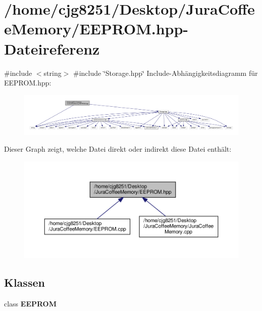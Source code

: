 \section{/home/cjg8251/\+Desktop/\+Jura\+Coffee\+Memory/\+E\+E\+P\+R\+OM.hpp-\/\+Dateireferenz}
\label{_e_e_p_r_o_m_8hpp}
{\ttfamily \#include $<$string$>$}\newline
{\ttfamily \#include \char`\"{}Storage.\+hpp\char`\"{}}\newline
Include-\/\+Abhängigkeitsdiagramm für E\+E\+P\+R\+O\+M.\+hpp\+:
\nopagebreak
\begin{figure}[H]
\begin{center}
\leavevmode
\includegraphics[width=350pt]{_e_e_p_r_o_m_8hpp__incl}
\end{center}
\end{figure}
Dieser Graph zeigt, welche Datei direkt oder indirekt diese Datei enthält\+:
\nopagebreak
\begin{figure}[H]
\begin{center}
\leavevmode
\includegraphics[width=350pt]{_e_e_p_r_o_m_8hpp__dep__incl}
\end{center}
\end{figure}
\subsection*{Klassen}
\begin{DoxyCompactItemize}
\item 
class \textbf{ E\+E\+P\+R\+OM}
\end{DoxyCompactItemize}
